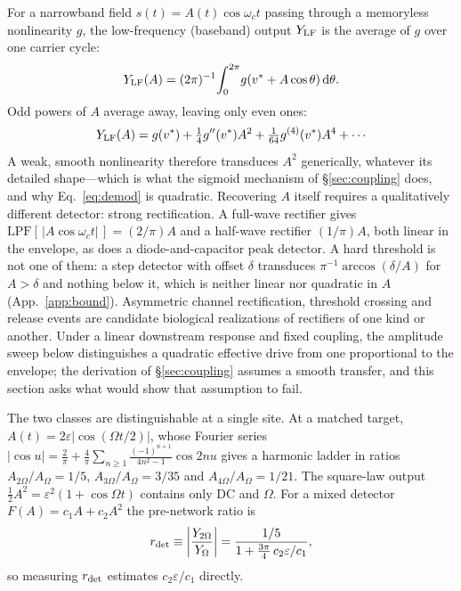 \documentclass[11pt,a4paper]{article}
\newcommand{\half}{\tfrac{1}{2}}
\begin{document}
For a narrowband field $s(t)=A(t)\cos\omega_c t$ passing through a memoryless nonlinearity
$g$, the low-frequency (baseband) output $Y_{\rm LF}$ is the average of $g$ over one
carrier cycle:
\[
Y_{\rm LF}(A)=(2\pi)^{-1}\!\int_0^{2\pi}\!g(v^*+A\cos\theta)\,\mathrm{d}\theta.
\]
Odd powers of $A$ average away, leaving only even ones:
\begin{equation}
Y_{\rm LF}(A)=g(v^*)+\tfrac14 g''(v^*)A^2+\tfrac1{64}g^{(4)}(v^*)A^4+\cdots
\label{eq:cycavg}
\end{equation}
A weak, smooth nonlinearity therefore transduces $A^2$ generically, whatever its detailed
shape---which is what the sigmoid mechanism of \S\ref{sec:coupling} does, and why
Eq.~\eqref{eq:demod} is quadratic. Recovering $A$ itself requires a qualitatively
different detector: strong rectification. A full-wave rectifier gives
$\mathrm{LPF}[\,|A\cos\omega_c t|\,]=(2/\pi)A$ and a half-wave rectifier
$(1/\pi)A$, both linear in the envelope, as does a diode-and-capacitor peak detector.
A hard threshold is not one of them: a step detector with offset $\delta$ transduces
$\pi^{-1}\arccos(\delta/A)$ for $A>\delta$ and nothing below it, which is neither linear
nor quadratic in $A$ (App.~\ref{app:bound}). Asymmetric channel rectification, threshold
crossing and release events are candidate biological realizations of rectifiers of one
kind or another. Under a linear downstream response and fixed coupling, the amplitude
sweep below distinguishes a quadratic effective drive from one proportional to the
envelope; the derivation of \S\ref{sec:coupling} assumes a smooth transfer, and this
section asks what would show that assumption to fail.

The two classes are distinguishable at a single site. At a matched target,
$A(t)=2\varepsilon|\cos(\Omega t/2)|$, whose Fourier series
$|\cos u|=\tfrac2\pi+\tfrac4\pi\sum_{n\ge1}\tfrac{(-1)^{n+1}}{4n^2-1}\cos 2nu$ gives a
harmonic ladder in ratios $A_{2\Omega}/A_\Omega=1/5$, $A_{3\Omega}/A_\Omega=3/35$ and
$A_{4\Omega}/A_\Omega=1/21$. The square-law output $\half A^2=\varepsilon^2(1+\cos\Omega
t)$ contains only DC and $\Omega$. For a mixed detector $F(A)=c_1A+c_2A^2$ the
pre-network ratio is
\begin{equation}
r_{\rm det}\equiv\left|\frac{Y_{2\Omega}}{Y_\Omega}\right|
=\frac{1/5}{1+\tfrac{3\pi}{4}\,c_2\varepsilon/c_1},
\label{eq:rdet}
\end{equation}
so measuring $r_{\rm det}$ estimates $c_2\varepsilon/c_1$ directly.
\end{document}
